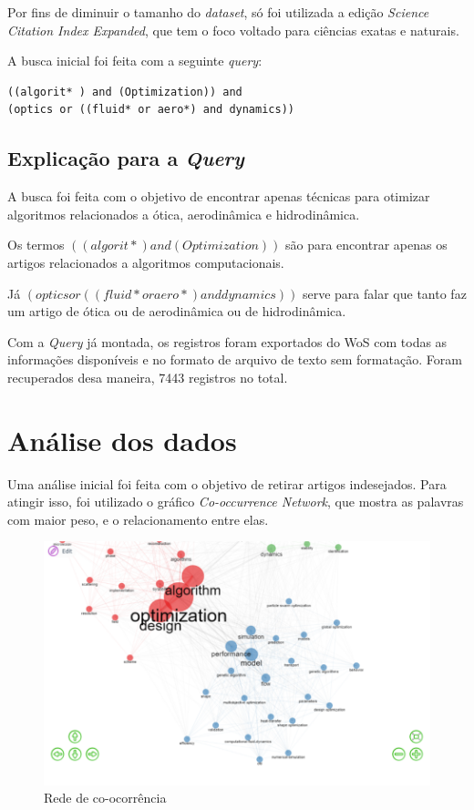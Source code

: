     Por fins de diminuir o tamanho do \emph{dataset}, só foi utilizada a edição \emph{Science Citation Index Expanded}, que tem o foco voltado para ciências exatas e naturais.
    
    A busca inicial foi feita com a seguinte \emph{query}:
\begin{lstlisting}
((algorit* ) and (Optimization)) and 
(optics or ((fluid* or aero*) and dynamics))
\end{lstlisting}
\subsection{Explicação para a \emph{Query}}
    A busca foi feita com o objetivo de encontrar apenas técnicas para otimizar algoritmos relacionados a ótica, aerodinâmica e hidrodinâmica.
    
    Os termos $((algorit* ) and (Optimization))$ são para encontrar apenas os artigos relacionados a algoritmos computacionais.
    
    Já $(optics or ((fluid* or aero*) and dynamics))$ serve para falar que tanto faz um artigo de ótica ou de aerodinâmica ou de hidrodinâmica.
    
    Com a \emph{Query} já montada, os registros foram exportados do WoS com todas as informações disponíveis e no formato de arquivo de texto sem formatação. Foram recuperados desa maneira, 7443 registros no total.
\section{Análise dos dados}
    Uma análise inicial foi feita com o objetivo de retirar artigos indesejados. Para atingir isso, foi utilizado o gráfico \emph{Co-occurrence Network}, que mostra as palavras com maior peso, e o relacionamento entre elas.
    
     \begin{figure}
    \centering
    \includegraphics[width=1\textwidth]{experiments/KvotheKS/PesqBibliogr/AlgoritmosSimulacaoOptica-Dinamica/WoS-20220202/OldQueryDataset/CoOccurrence.png}
    \caption{Rede de co-ocorrência}
    \label{fig:KvotheKS:OldQueryCoOccurrence}
\end{figure}
    
